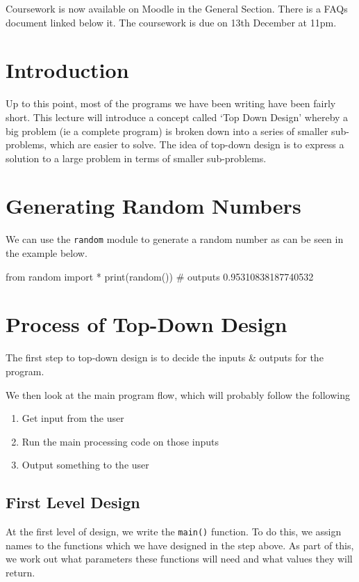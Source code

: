 Coursework is now available on Moodle in the General Section. There is a FAQs document linked below it. The coursework is due on 13th December at 11pm.

\section*{Introduction}
Up to this point, most of the programs we have been writing have been fairly short. This lecture will introduce a concept called `Top Down Design' whereby a big problem (ie a complete program) is broken down into a series of smaller sub-problems, which are easier to solve. The idea of top-down design is to express a solution to a large problem in terms of smaller sub-problems.

\section*{Generating Random Numbers}
We can use the \texttt{random} module to generate a random number as can be seen in the example below.
\begin{python}
from random import *
print(random()) # outputs 0.95310838187740532
\end{python}

\section*{Process of Top-Down Design}
The first step to top-down design is to decide the inputs \& outputs for the program.

We then look at the main program flow, which will probably follow the following
\begin{enumerate}
    \item Get input from the user
    \item Run the main processing code on those inputs
    \item Output something to the user
\end{enumerate}
\subsection*{First Level Design}
At the first level of design, we write the \texttt{main()} function. To do this, we assign names to the functions which we have designed in the step above. As part of this, we work out what parameters these functions will need and what values they will return. 
